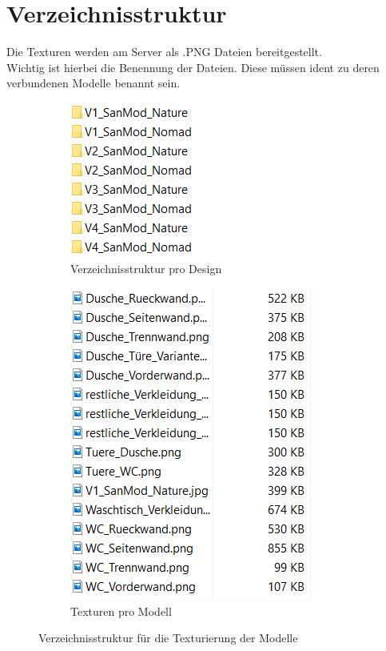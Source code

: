 \section{Verzeichnisstruktur}\label{sec:Verzeichnisstruktur}
Die Texturen werden am Server als .PNG Dateien bereitgestellt. \\
Wichtig ist hierbei die Benennung der Dateien. Diese müssen ident zu deren verbundenen Modelle benannt sein.
\begin{figure}[h]
    \begin{subfigure}{0.5\textwidth}
    \centering
    \includegraphics[width=0.7\linewidth]{images/ordner.PNG} 
    \caption{Verzeichnisstruktur pro Design}
    \label{fig:subim1}
    \end{subfigure}
    \begin{subfigure}{0.5\textwidth}
    \centering
    \includegraphics[width=0.6\linewidth]{images/texturenPngs.PNG}
    \caption{Texturen pro Modell}
    \label{fig:subim2}
    \end{subfigure}
\caption{Verzeichnisstruktur für die Texturierung der Modelle}
\label{fig:image2}
\end{figure}
\newpage

